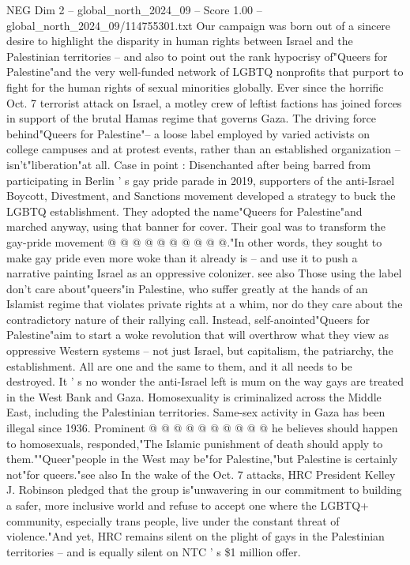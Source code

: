 \begin{textsample}{NEG Dim 2 – global\_north\_2024\_09 – Score 1.00 – global\_north\_2024\_09/114755301.txt}  \label{ex:f2_neg_036}
Our campaign was born out of a sincere desire to highlight the disparity in human rights between Israel and the Palestinian territories -- and also to point out the rank hypocrisy of"Queers for Palestine"and the very well-funded network of LGBTQ nonprofits that purport to fight for the human rights of sexual minorities globally.
Ever since the horrific Oct. 7 terrorist attack on Israel, a motley crew of leftist factions has joined forces in support of the brutal Hamas regime that governs Gaza.
The driving force behind"Queers for Palestine"-- a loose label employed by varied activists on college campuses and at protest events, rather than an established organization -- isn't"liberation"at all.
Case in point : Disenchanted after being barred from participating in Berlin ' s gay pride parade in 2019, supporters of the anti-Israel Boycott, Divestment, and Sanctions movement developed a strategy to buck the LGBTQ establishment.
They adopted the name"Queers for Palestine"and marched anyway, using that banner for cover.
Their goal was to transform the gay-pride movement @ @ @ @ @ @ @ @ @ @."In other words, they sought to make gay pride even more woke than it already is -- and use it to push a narrative painting Israel as an oppressive colonizer. see also Those using the label don't care about"queers"in Palestine, who suffer greatly at the hands of an Islamist regime that violates private rights at a whim, nor do they care about the contradictory nature of their rallying call.
Instead, self-anointed"Queers for Palestine"aim to start a woke revolution that will overthrow what they view as oppressive Western systems -- not just Israel, but capitalism, the patriarchy, the establishment.
All are one and the same to them, and it all needs to be destroyed.
It ' s no wonder the anti-Israel left is mum on the way gays are treated in the West Bank and Gaza.
Homosexuality is criminalized across the Middle East, including the Palestinian territories.
Same-sex activity in Gaza has been illegal since 1936.
Prominent @ @ @ @ @ @ @ @ @ @ he believes should happen to homosexuals, responded,"The Islamic punishment of death should apply to them.""Queer"people in the West may be"for Palestine,"but Palestine is certainly not"for queers."see also In the wake of the Oct. 7 attacks, HRC President Kelley J.
Robinson pledged that the group is"unwavering in our commitment to building a safer, more inclusive world and refuse to accept one where the LGBTQ+ community, especially trans people, live under the constant threat of violence."And yet, HRC remains silent on the plight of gays in the Palestinian territories -- and is equally silent on NTC ' s \$1 million offer.

\end{textsample}
